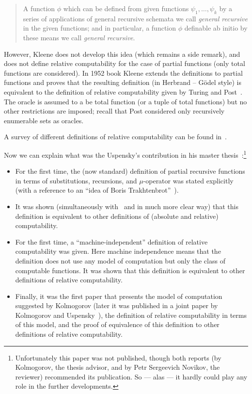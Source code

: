 \documentclass[12pt]{article}
\theoremstyle{remark}
\begin{document}
\begin{quote}
A function $\phi$ which can be defined from given functions $\psi_1,\ldots,\psi_k$ by a series of applications of general recursive schemata we call \emph{general recursive} in the given functions; and in particular, a function $\phi$ definable ab initio by these means we call \emph{general recursive}.
\end{quote}
However, Kleene does not develop this idea (which remains a side remark), and does not define relative computability for the case of partial functions (only total functions are considered). In 1952 book Kleene extends the definitions to partial functions and proves that the resulting definition (in Herbrand -- G\"{o}del style) is equivalent to the definition of relative computability given by Turing and Post~\cite[\S 69]{Kleene1957}. The oracle is assumed to a be total function (or a tuple of total functions) but no other restrictions are imposed; recall that Post considered only recursively enumerable sets as oracles.

A survey of different definitions of relative computability can be found in~\cite[Section 4.3, ``History of Relative Computability'']{Soare1996}.

Now we can explain what was the Uspensky's contribution in his master thesis~\cite{1952}:\footnote{Unfortunately this paper was not published, though both reports (by Kolmogorov, the thesis advisor, and by Petr Sergeevich Novikov, the reviewer) recommended its publication. So --- alas --- it hardly could play any role in the further developments.}

\begin{itemize}

\item  For the first time, the (now standard) definition of partial recursive functions in terms of substitutions, recursions, and $\mu$-operator was stated explicitly (with a reference to an ``idea of Boris Trakhtenbrot''~\cite[p.~22]{1952}).

\item It was shown (simultaneously with~\cite[\S 69]{Kleene1957} and in much more clear way) that this definition is equivalent to other definitions of (absolute and relative) computability.

\item For the first time, a ``machine-independent'' definition of relative computability was given. Here machine independence means that the definition does not use any model of computation but only the class of computable functions. It was shown that this definition is equivalent to other definitions of relative computability.

\item Finally, it was the first paper that presents the model of computation suggested by Kolmogorov (later it was published in a joint paper by Kolmogorov and Uspensky~\cite{1958}), the definition of relative computability in terms of this model, and the proof of equivalence of this definition to other definitions of relative computability.
\end{itemize}
\end{document}

